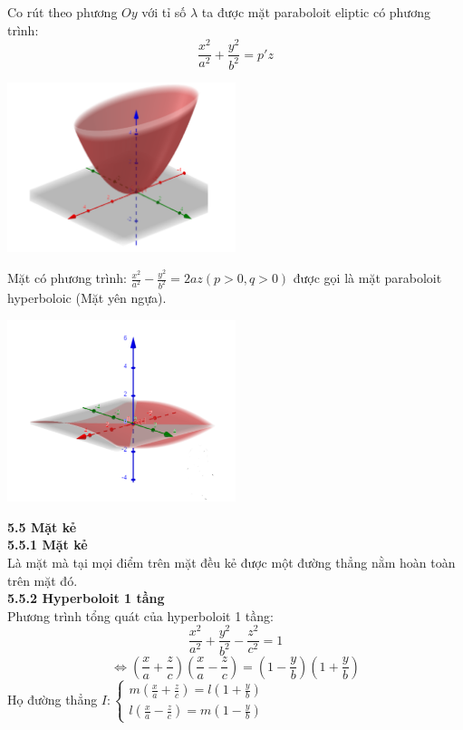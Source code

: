 \documentclass[12pt,a4]{article}
\begin{document}
\begin{titlepage}
\begin{center}
\end{center}
Co rút theo phương $Oy$ với tỉ số $\lambda$ ta được mặt paraboloit eliptic có phương trình:
\[
\frac{x^2}{a^2} + \frac{y^2}{b^2} = p'z
\]
\begin{center}
    \includegraphics[width=0.5\textwidth]{image/pa2.png}
\end{center}
Mặt có phương trình: $\frac{x^2}{a^2} - \frac{y^2}{b^2} = 2az (p > 0, q > 0)$ được gọi là mặt paraboloit hyperboloic (Mặt yên ngựa).\\
\begin{center}
    \includegraphics[width=0.5\textwidth]{image/pa3.png}
\end{center}
\textbf{5.5 Mặt kẻ}\\
\textbf{5.5.1 Mặt kẻ}\\
Là mặt mà tại mọi điểm trên mặt đều kẻ được một đường thẳng nằm hoàn toàn trên mặt đó.\\
\vspace{0.2cm}
\textbf{5.5.2 Hyperboloit 1 tầng}\\
\vspace{0.2cm}
Phương trình tổng quát của hyperboloit 1 tầng:
\[
\frac{x^2}{a^2} + \frac{y^2}{b^2} - \frac{z^2}{c^2} = 1
\]
\[
\Leftrightarrow (\frac{x}{a} + \frac{z}{c})(\frac{x}{a} - \frac{z}{c}) = (1 - \frac{y}{b})(1 + \frac{y}{b})
\]
Họ đường thẳng $I: \begin{cases} m(\frac{x}{a} + \frac{z}{c}) = l(1 + \frac{y}{b}) \\ l(\frac{x}{a} - \frac{z}{c}) = m(1 - \frac{y}{b})\end{cases}$\\

\end{titlepage}
\end{document}
